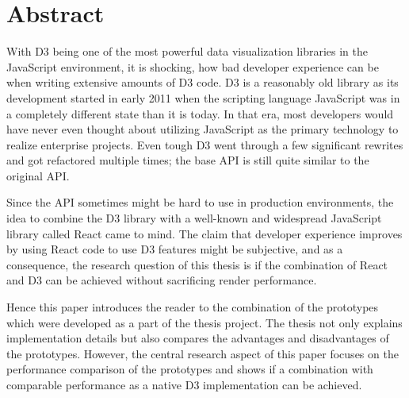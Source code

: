 \chapter{Abstract}

With D3 being one of the most powerful data visualization libraries in the JavaScript environment, it is shocking, how bad developer experience can be when writing extensive amounts of D3 code. D3 is a reasonably old library as its development started in early 2011 when the scripting language JavaScript was in a completely different state than it is today. In that era, most developers would have never even thought about utilizing JavaScript as the primary technology to realize enterprise projects. Even tough D3 went through a few significant rewrites and got refactored multiple times; the base API is still quite similar to the original API. 

Since the API sometimes might be hard to use in production environments, the idea to combine the D3 library with a well-known and widespread JavaScript library called React came to mind. The claim that developer experience improves by using React code to use D3 features might be subjective, and as a consequence, the research question of this thesis is if the combination of React and D3 can be achieved without sacrificing render performance. 

Hence this paper introduces the reader to the combination of the prototypes which were developed as a part of the thesis project. The thesis not only explains implementation details but also compares the advantages and disadvantages of the prototypes. However, the central research aspect of this paper focuses on the performance comparison of the prototypes and shows if a combination with comparable performance as a native D3 implementation can be achieved.

